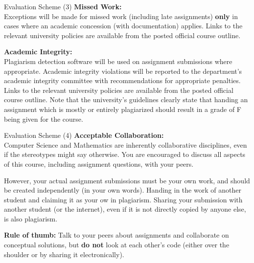 \documentclass[11pt]{beamer}
\begin{document}
  \begin{frame}{Evaluation Scheme (3)}
    \textbf{Missed Work:} \\
    Exceptions will be made for missed work (including late assignments)
    \textbf{only} in cases where an academic concession (with documentation)
    applies. Links to the relevant university policies are available from the
    posted official course outline. \medskip

    \textbf{Academic Integrity:} \\
    Plagiarism detection software will be used on assignment submissions where
    appropriate. Academic integrity violations will be reported to the
    department's academic integrity committee with recommendations for
    appropriate penalties. Links to the relevant university policies are
    available from the posted official course outline. Note that the
    university's guidelines clearly state that handing an assignment which is
    mostly or entirely plagiarized should result in a grade of F being given for
    the course.
  \end{frame}

  \begin{frame}{Evaluation Scheme (4)}
    \textbf{Acceptable Collaboration:} \\
    Computer Science and Mathematics are inherently collaborative disciplines,
    even if the stereotypes might say otherwise. You are encouraged to discuss
    all aspects of this course, including assignment questions, with your peers.

    However, your actual assignment submissions must be your own work, and
    should be created independently (in your own words). Handing in the work of
    another student and claiming it as your ow in plagiarism. Sharing your
    submission with another student (or the internet), even if it is not
    directly copied by anyone else, is also plagiarism. \medskip

    \textbf{Rule of thumb:} Talk to your peers about assignments and collaborate
    on conceptual solutions, but \textbf{do not} look at each other's code
    (either over the shoulder or by sharing it electronically).
  \end{frame}
\end{document}
